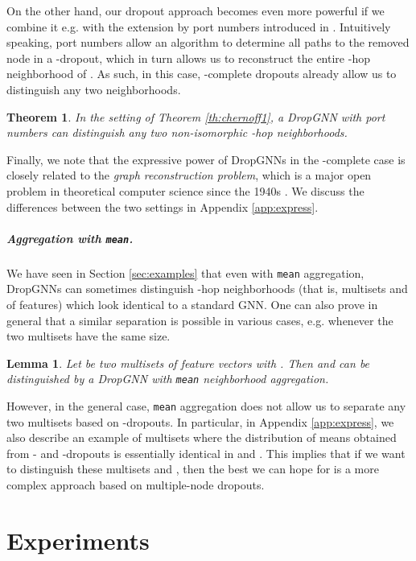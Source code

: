 \documentclass{article}
\newtheorem{theorem}{Theorem}
\newtheorem{lemma}{Lemma}
\begin{document}
On the other hand, our dropout approach becomes even more powerful if we combine it e.g. with the extension by port numbers introduced in \citep{ports}. Intuitively speaking, port numbers allow an algorithm to determine all paths to the removed node in a -dropout, which in turn allows us to reconstruct the entire -hop neighborhood of . As such, in this case, -complete dropouts already allow us to distinguish any two neighborhoods.

\begin{theorem} \label{th:ports}
In the setting of Theorem \ref{th:chernoff1}, a DropGNN with port numbers can distinguish any two non-isomorphic -hop neighborhoods.
\end{theorem}

Finally, we note that the expressive power of DropGNNs in the -complete case is closely related to the \textit{graph reconstruction problem}, which is a major open problem in theoretical computer science since the 1940s \citep{reconstruction}. We discuss the differences between the two settings in Appendix \ref{app:express}.

\subparagraph*{Aggregation with \texttt{mean}.} We have seen in Section \ref{sec:examples} that even with \texttt{mean} aggregation, DropGNNs can sometimes distinguish -hop neighborhoods (that is, multisets  and  of features) which look identical to a standard GNN. One can also prove in general that a similar separation is possible in various cases, e.g. whenever the two multisets have the same size.

\begin{lemma} \label{th:mean}
Let  be two multisets of feature vectors with . Then  and  can be distinguished by a DropGNN with \texttt{mean} neighborhood aggregation.
\end{lemma}

However, in the general case, \texttt{mean} aggregation does not allow us to separate any two multisets based on -dropouts. In particular, in Appendix \ref{app:express}, we also describe an example of multisets  where the distribution of means obtained from - and -dropouts is essentially identical in  and . This implies that if we want to distinguish these multisets  and , then the best we can hope for is a more complex approach based on multiple-node dropouts.

\section{Experiments}
\end{document}
